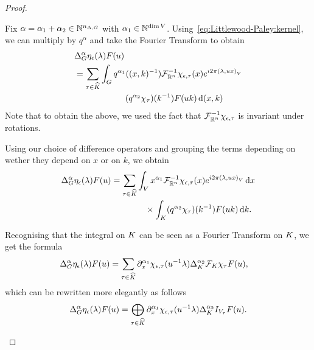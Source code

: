\begin{proof}
\begin{description}
            Fix $\alpha = \alpha_1 + \alpha_2 \in \N^{\dimDifferenceOperators}$ with $\alpha_1 \in \N^{\dim \VectorSpace}$.
            Using~\eqref{eq:Littlewood-Paley:kernel},
            we can multiply by $q^\alpha$ and take the Fourier Transform to obtain
            \begin{align*}
                &\DifferenceOperatorOrder \alpha \eta_\epsilon(\lambda) F(u)\\
                &= \sum_{\tau \in \dualGroup \CompactGroup} \int_\Group
                q^{\alpha_1}((x, k)^{-1}) \InverseFourier [\R^n] \chi_{\epsilon, \tau}(x) \e^{\i \turn \ip \lambda {u x}}\\
                & \qquad \qquad \qquad (q^{\alpha_2} \chi_\tau)(k^{-1}) F(u k) \dd (x, k)
            \end{align*}
            Note that to obtain the above,
            we used the fact that $\InverseFourier [\R^n] \chi_{\epsilon, \tau}$ is invariant under rotations.

            Using our choice of difference operators and grouping the terms depending on
            wether they depend on $x$ or on $k$,
            we obtain
            \begin{align*}
                \DifferenceOperatorOrder \alpha \eta_\epsilon(\lambda) F(u)
                &= \sum_{\tau \in \dualGroup \CompactGroup}
                \int_\VectorSpace x^{\alpha_1} \InverseFourier [\R^n] \chi_{\epsilon, \tau}(x) \e^{\i \turn \ip \lambda {u x}} \dd x\\
                & \qquad \qquad \times \int_\CompactGroup (q^{\alpha_2} \chi_\tau)(k^{-1}) F(u k) \dd k.
            \end{align*}

            Recognising that the integral on $\CompactGroup$ can be seen as a Fourier Transform on $\CompactGroup$,
            we get the formula
            \begin{align*}
                \DifferenceOperatorOrder \alpha \eta_\epsilon(\lambda) F(u)
                &= \sum_{\tau \in \dualGroup \CompactGroup}
                \iD {x^{\alpha_1} } \chi_{\epsilon, \tau}(u^{-1} \lambda)
                \DifferenceOperatorOrder [\CompactGroup] {\alpha_2} \Fourier [\CompactGroup] \chi_\tau F(u),
            \end{align*}
            which can be rewritten more elegantly as follows
            \begin{align}
                \DifferenceOperatorOrder \alpha \eta_\epsilon(\lambda) F(u)
                = \bigoplus_{\tau \in \dualGroup \CompactGroup}
                \iD {x^{\alpha_1} } \chi_{\epsilon, \tau}(u^{-1} \lambda)
                \DifferenceOperatorOrder [\CompactGroup] {\alpha_2} \Id {V_\tau} F(u).
                \label{eq:Littlewood-Paley:difference_operators}
            \end{align}


\end{description}
\end{proof}
